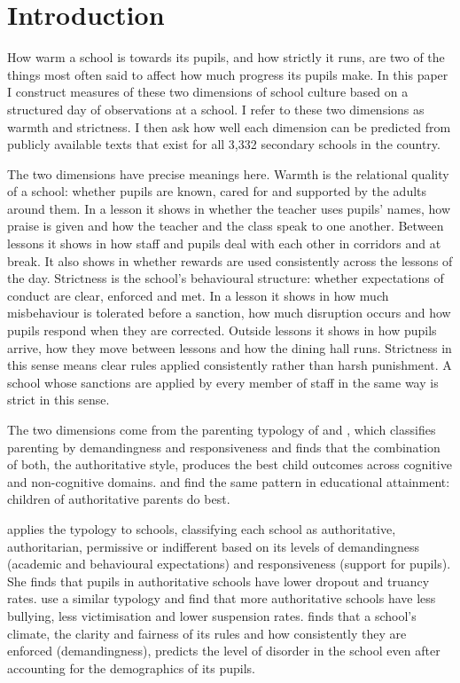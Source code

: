 \section{Introduction}
\label{sec:p1_intro}

How warm a school is towards its pupils, and how strictly it runs, are two of
the things most often said to affect how much progress its pupils make. In this paper I construct
measures of these two dimensions of school culture based on a structured day of observations at a school. I refer to these
two dimensions as warmth and strictness. I then ask how well each dimension can be predicted from publicly available texts that exist for all 3,332 secondary schools in the country.

The two dimensions have precise meanings here. Warmth is
the relational quality of a school: whether pupils are known, cared for and
supported by the adults around them. In a lesson it shows in whether the
teacher uses pupils' names, how praise is given and how the teacher and the
class speak to one another. Between lessons it shows in how staff and pupils
deal with each other in corridors and at break. It also shows in whether rewards are
used consistently across the lessons of the day. Strictness is the school's
behavioural structure: whether
expectations of conduct are clear, enforced and met. In a lesson it shows in
how much misbehaviour is tolerated before a sanction, how much disruption
occurs and how pupils respond when they are corrected. Outside lessons it
shows in how pupils arrive, how they move between lessons and how the dining
hall runs. Strictness in this sense means clear rules applied consistently rather than harsh punishment. A school whose
sanctions are applied by every member of staff in the same way is strict in
this sense.

The two dimensions come from the parenting typology of \citet{baumrind1971}
and \citet{maccoby1983}, which classifies parenting by demandingness and
responsiveness and finds that the combination of both, the authoritative
style, produces the best child outcomes across cognitive and non-cognitive
domains. \citet{majumder2015} and \citet{zhang2017} find the same pattern in educational attainment: children of authoritative parents do best.

\citet{pellerin2005} applies the typology to schools, classifying each school as authoritative,
authoritarian, permissive or indifferent based on its levels of demandingness
(academic and behavioural expectations) and responsiveness (support for pupils). She finds that
pupils in authoritative schools have lower dropout and truancy rates.
\citet{gregory2010,gregory2011} use a similar typology and find that more authoritative schools
have less bullying, less victimisation and lower suspension rates. \citet{gottfredson2005} finds
that a school's climate, the clarity and fairness of its rules and how consistently they are
enforced (demandingness), predicts the level of disorder in the school even after accounting for the demographics of its pupils.

